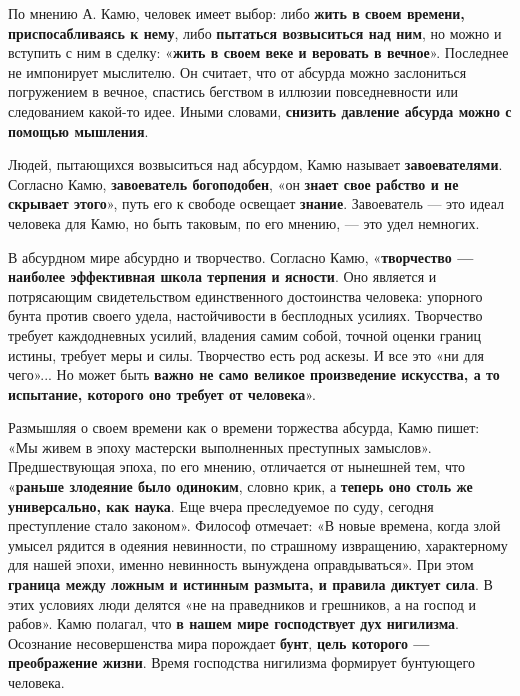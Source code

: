 \documentclass{article}
\begin{document}
\begin{flushleft}
\hfill

По мнению А. Камю, человек имеет выбор: либо \textbf{жить в своем времени, приспосабливаясь к нему}, либо \textbf{пытаться возвыситься над ним}, но можно и вступить с ним в сделку: «\textbf{жить в своем веке и веровать в вечное}». Последнее не импонирует мыслителю. Он считает, что от абсурда можно заслониться погружением в вечное, спастись бегством в иллюзии повседневности или следованием какой-то идее. Иными словами, \textbf{снизить давление абсурда можно с помощью мышления}.

\hfill

Людей, пытающихся возвыситься над абсурдом, Камю называет \textbf{завоевателями}. Согласно Камю, \textbf{завоеватель богоподобен}, «он \textbf{знает свое рабство и не скрывает этого}», путь его к свободе освещает \textbf{знание}. Завоеватель — это идеал человека для Камю, но быть таковым, по его мнению, — это удел немногих.

\hfill

В абсурдном мире абсурдно и творчество. Согласно Камю, «\textbf{творчество — наиболее эффективная школа терпения и ясности}. Оно является и потрясающим свидетельством единственного достоинства человека: упорного бунта против своего удела, настойчивости в бесплодных усилиях. Творчество требует каждодневных усилий, владения самим собой, точной оценки границ истины, требует меры и силы. Творчество есть род аскезы. И все это «ни для чего»... Но может быть \textbf{важно не само великое произведение искусства, а то испытание, которого оно требует от человека}».

\hfill

Размышляя о своем времени как о времени торжества абсурда, Камю пишет: «Мы живем в эпоху мастерски выполненных преступных замыслов». Предшествующая эпоха, по его мнению, отличается от нынешней тем, что «\textbf{раньше злодеяние было одиноким}, словно крик, а \textbf{теперь оно столь же универсально, как наука}. Еще вчера преследуемое по суду, сегодня преступление стало законом». Философ отмечает: «В новые времена, когда злой умысел рядится в одеяния невинности, по страшному извращению, характерному для нашей эпохи, именно невинность вынуждена оправдываться». При этом \textbf{граница между ложным и истинным размыта, и правила диктует сила}. В этих условиях люди делятся «не на праведников и грешников, а на господ и рабов». Камю полагал, что \textbf{в нашем мире господствует дух нигилизма}. Осознание несовершенства мира порождает \textbf{бунт}, \textbf{цель которого — преображение жизни}. Время господства нигилизма формирует бунтующего человека.


\end{flushleft}
\end{document}

